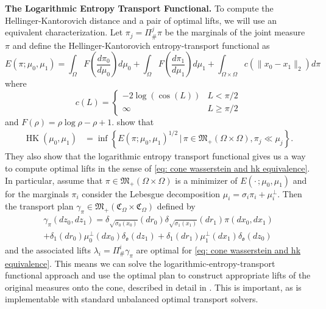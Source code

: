 \documentclass[11pt]{article}
\newcommand{\HK}{\operatorname{HK}}
\begin{document}
\noindent \textbf{The Logarithmic Entropy Transport Functional.}
To compute the Hellinger-Kantorovich distance and a pair of optimal lifts, we will use an equivalent characterization. Let $\pi_j = \Pi^j_\#\pi$ be the marginals of the joint measure $\pi$ and define the Hellinger-Kantorovich entropy-transport functional as
\begin{equation} \label{eq: let functional}
    E(\pi; \mu_0, \mu_1) = \int_{\Omega}F\left(\frac{d\pi_0}{d\mu_0}\right)d\mu_0 + \int_{\Omega}F\left(\frac{d\pi_1}{d\mu_1}\right)d\mu_1 + \int_{\Omega \times \Omega}c(\|x_0 - x_1\|_2)d\pi
\end{equation}
where
\begin{equation*}
    c(L) = \begin{cases}
        -2\log(\cos(L)) & L < \pi/2 \\
        \infty & L \geq \pi/2
    \end{cases}
\end{equation*}
and $F(\rho) = \rho\log\rho - \rho + 1.$ \citet{liero2016optimal} show that 
\begin{align} \label{eq: let hk equivalence}
    \HK(\mu_0, \mu_1) &= \inf\left\{E(\pi;\mu_0, \mu_1)^{1/2} \, |\, \pi  \in \mathfrak{M}_+(\Omega \times \Omega), \pi_j  \ll \mu_j\right\}.
\end{align}
They also show that the logarithmic entropy transport functional gives us a way to compute optimal lifts in the sense of \cref{eq: cone wasserstein and hk equivalence}. In particular, assume that $\pi \in \mathfrak{M}_+(\Omega \times \Omega)$ is a minimizer of $E(\cdot\,; \mu_0, \mu_1)$ and for the marginals $\pi_i$ consider the Lebesgue decomposition $\mu_i = \sigma_i\pi_i + \mu_i^\perp$. Then the transport plan $\gamma_{\pi} \in \mathfrak{M}_+(\mathfrak{C}_{\Omega} \times \mathfrak{C}_{\Omega})$ defined by
\begin{multline}\label{eq: optimal lift}
    \gamma_{\pi}(dz_0, dz_1) = \delta_{\sqrt{\sigma_0(x_0)}}(dr_0)\delta_{\sqrt{\sigma_1(x_1)}}(dr_1)\pi(dx_0, dx_1) \\
    + \delta_1(dr_0)\mu_0^\perp(dx_0)\delta_{\mathfrak{o}}(dz_1) + \delta_1(dr_1)\mu_1^\perp(dx_1)\delta_{\mathfrak{o}}(dz_0) 
\end{multline}
and the associated lifts $\lambda_i = \Pi_{\#}^i\gamma_\pi$ are optimal for \cref{eq: cone wasserstein and hk equivalence}. This means we can solve the logarithmic-entropy-transport functional approach and use the optimal plan to construct appropriate lifts of the original measures onto the cone, described in detail in . This is important, as  is implementable with standard unbalanced optimal transport solvers. 
\end{document}
